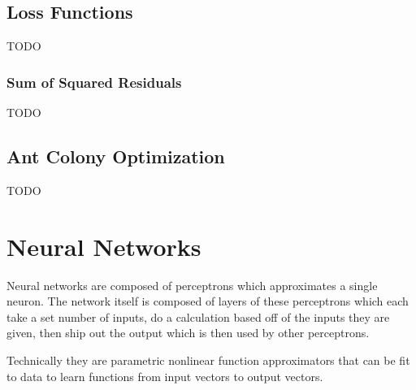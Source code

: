 \subsection{Loss Functions}
TODO
\subsubsection{Sum of Squared Residuals}
TODO

\subsection{Ant Colony Optimization}
TODO

\section{Neural Networks}
Neural networks are composed of perceptrons which approximates a single neuron. The network itself is composed of layers of these perceptrons which each take a set number of inputs, do a calculation based off of the inputs they are given, then ship out the output which is then used by other perceptrons.

Technically they are parametric nonlinear function approximators that can be fit to data to learn functions from input vectors to output vectors.

